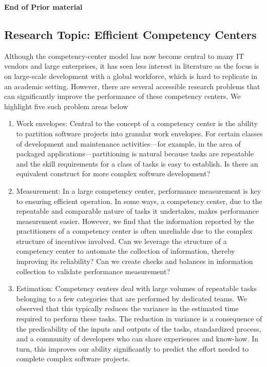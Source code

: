 \textbf{End of Prior material}

\subsection{Research Topic: Efficient Competency Centers}

Although the competency-center model has now become central to many IT vendors
and large enterprises, it has seen less interest in literature as the focus is
on large-scale development with a global workforce, which is hard to replicate
in an academic setting. However, there are several accessible research problems
that can significantly improve the performance of these competency centers. We
highlight five such problem areas below

\begin{enumerate}

\item Work envelopes: Central to the concept of a competency center is the
  ability to partition software projects into granular work envelopes. For
  certain classes of development and maintenance activities---for example, in
  the area of packaged applications---partitioning is natural because tasks are
  repeatable and the skill requirements for a class of tasks is easy to
  establish. Is there an equivalent construct for more complex software
  development?

\item Measurement: In a large competency center, performance measurement is key
  to ensuring efficient operation. In some ways, a competency center, due to the
  repeatable and comparable nature of tasks it undertakes, makes performance
  measurement easier. However, we find that the information reported by the
  practitioners of a competency center is often unreliable due to the complex
  structure of incentives involved. Can we leverage the structure of a
  competency center to automate the collection of information, thereby improving
  its reliability? Can we create checks and balances in information collection
  to validate performance measurement?

\item Estimation: Competency centers deal with large volumes of repeatable tasks
  belonging to a few categories that are performed by dedicated teams. We
  observed that this typically reduces the variance in the estimated time
  required to perform these tasks. The reduction in variance is a consequence of
  the predicability of the inputs and outputs of the tasks, standardized
  process, and a community of developers who can share experiences and
  know-how. In turn, this improves our ability significantly to predict the
  effort needed to complete complex software projects.


\end{enumerate}
